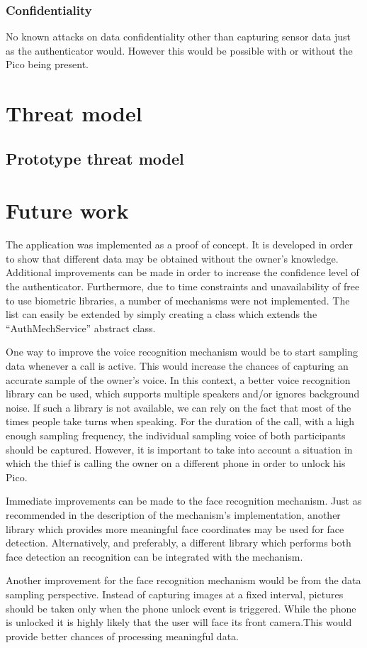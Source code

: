 	\subsubsection*{Confidentiality}
	No known attacks on data confidentiality other than capturing sensor data just as the authenticator would. However this would be possible with or without the Pico being present.



\section{Threat model}



\subsection{Prototype threat model}



\section{Future work}
The application was implemented as a proof of concept. It is developed in order to show that different data may be obtained without the owner's knowledge. Additional improvements can be made in order to increase the confidence level of the authenticator.  Furthermore, due to time constraints and unavailability of free to use biometric libraries, a number of mechanisms were not implemented. The list can easily be extended by simply creating a class which extends the ``AuthMechService'' abstract class.

One way to improve the voice recognition mechanism would be to start sampling data whenever a call is active. This would increase the chances of capturing an accurate sample of the owner's voice. In this context, a better voice recognition library can be used, which supports multiple speakers and/or ignores background noise. If such a library is not available, we can rely on the fact that most of the times people take turns when speaking. For the duration of the call, with a high enough sampling frequency, the individual sampling voice of both participants should be captured. However, it is important to take into account a situation in which the thief is calling the owner on a different phone in order to unlock his Pico.

Immediate improvements can be made to the face recognition mechanism. Just as recommended in the description of the mechanism's implementation, another library which provides more meaningful face coordinates may be used for face detection. Alternatively, and preferably, a different library which performs both face detection an recognition can be integrated with the mechanism.

Another improvement for the face recognition mechanism would be from the data sampling perspective. Instead of capturing images at a fixed interval, pictures should be taken only when the phone unlock event is triggered. While the phone is unlocked it is highly likely that the user will face its front camera.This would provide better chances of processing meaningful data.